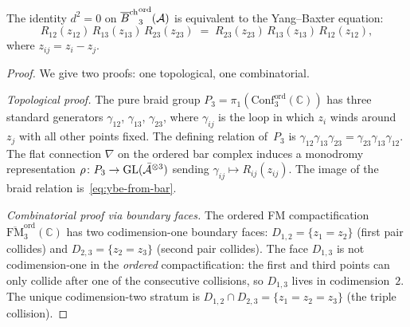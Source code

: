 \begin{proposition}[Yang--Baxter from $d^2=0$ on degree~$3$;
\ClaimStatusProvedHere]
The identity $d^2=0$ on
${\overline{B}^{\mathrm{ch}}}^{\mathrm{ord}}_3(\mathcal{A})$ is equivalent to the
Yang--Baxter equation:
\begin{equation}%
R_{12}(z_{12})\,R_{13}(z_{13})\,R_{23}(z_{23})
\;=\;
R_{23}(z_{23})\,R_{13}(z_{13})\,R_{12}(z_{12}),
\end{equation}
where $z_{ij}=z_i-z_j$.
\end{proposition}

\begin{proof}
We give two proofs: one topological, one combinatorial.

\emph{Topological proof.}
The pure braid group
$P_3=\pi_1(\mathrm{Conf}_3^{\mathrm{ord}}(\mathbb C))$
has three standard generators
$\gamma_{12}$, $\gamma_{13}$, $\gamma_{23}$, where
$\gamma_{ij}$ is the loop in which $z_i$ winds around $z_j$
with all other points fixed.
The defining relation of~$P_3$ is
$\gamma_{12}\gamma_{13}\gamma_{23}
=\gamma_{23}\gamma_{13}\gamma_{12}$.
The flat connection $\nabla$ on the ordered bar complex
induces a monodromy representation
$\rho\colon P_3\to\operatorname{GL}(\bar{\mathcal{A}}^{\otimes 3})$
sending $\gamma_{ij}\mapsto R_{ij}(z_{ij})$. The image
of the braid relation is~\eqref{eq:ybe-from-bar}.

\emph{Combinatorial proof via boundary faces.}
The ordered FM compactification
$\overline{\mathrm{FM}}_3^{\mathrm{ord}}(\mathbb C)$
has two codimension-one boundary faces:
$D_{1,2}=\{z_1=z_2\}$ (first pair collides) and
$D_{2,3}=\{z_2=z_3\}$ (second pair collides). The face
$D_{1,3}$ is not codimension-one in the \emph{ordered}
compactification: the first and third points can only
collide after one of the consecutive collisions, so
$D_{1,3}$ lives in codimension~$2$.
The unique codimension-two stratum is
$D_{1,2}\cap D_{2,3}=\{z_1=z_2=z_3\}$ (the triple collision).


\end{proof}
